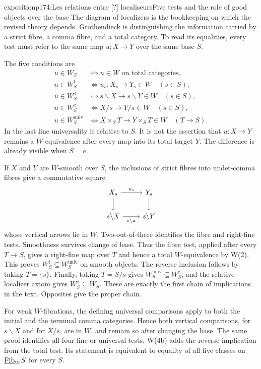 \begin{dcomment}{exposition}{p174:Les relations entre [?] localiseurs}{Five tests and the role of good objects over the base}
The diagram of localizers is the bookkeeping on which the revised theory depends. Grothendieck is distinguishing the information carried by a strict fibre, a comma fibre, and a total category. To read its equalities, every test must refer to the same map $u:X\to Y$ over the same base $S$.

The five conditions are
\[
\begin{aligned}
 u\in W_S&\iff u\in W\text{ on total categories},\\
 u\in W_S^{\mathrm f}&\iff u_s:X_s\to Y_s\in W\quad(s\in S),\\
 u\in W_S^{\mathrm d}&\iff s\backslash X\to s\backslash Y\in W\quad(s\in S),\\
 u\in W_S^{\mathrm g}&\iff X/s\to Y/s\in W\quad(s\in S),\\
 u\in W_S^{\mathrm{univ}}&\iff
 X\times_ST\to Y\times_ST\in W\quad(T\to S).
\end{aligned}
\]
In the last line universality is relative to $S$. It is not the assertion that $u:X\to Y$ remains a $W$-equivalence after every map into its total target $Y$. The difference is already visible when $S=e$.

If $X$ and $Y$ are $W$-smooth over $S$, the inclusions of strict fibres into under-comma fibres give a commutative square
\[
\begin{tikzcd}
 X_s\arrow[r,"u_s"]\arrow[d]&Y_s\arrow[d]\\
 s\backslash X\arrow[r,"s\backslash u"']&s\backslash Y
\end{tikzcd}
\]
whose vertical arrows lie in $W$. Two-out-of-three identifies the fibre and right-fine tests. Smoothness survives change of base. Thus the fibre test, applied after every $T\to S$, gives a right-fine map over $T$ and hence a total $W$-equivalence by W(2). This proves $W_S^{\mathrm f}\subseteq W_S^{\mathrm{univ}}$ on smooth objects. The reverse inclusion follows by taking $T=\{s\}$. Finally, taking $T=S/s$ gives $W_S^{\mathrm{univ}}\subseteq W_S^{\mathrm g}$, and the relative localizer axiom gives $W_S^{\mathrm g}\subseteq W_S$. These are exactly the first chain of implications in the text. Opposites give the proper chain.

For weak $W$-fibrations, the defining universal comparisons apply to both the initial and the terminal comma categories. Hence both vertical comparisons, for $s\backslash X$ and for $X/s$, are in $W$, and remain so after changing the base. The same proof identifies all four fine or universal tests. W(4b) adds the reverse implication from the total test. Its statement is equivalent to equality of all five classes on $\underline{\mathrm{Fib}}_W S$ for every $S$.


\end{dcomment}
